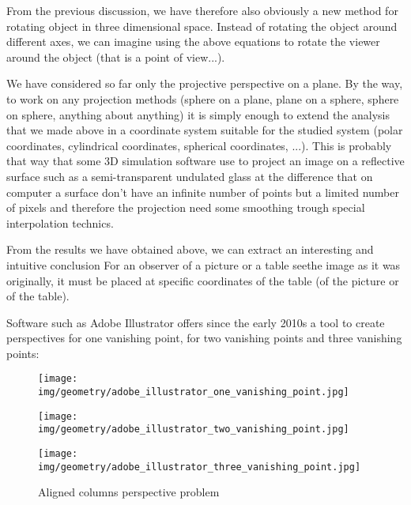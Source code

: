 	From the previous discussion, we have therefore also obviously a new method for rotating object in three dimensional space. Instead of rotating the object around different axes, we can imagine using the above equations to rotate the viewer around the object (that is a point of view...).

	We have considered so far only the projective perspective on a plane. By the way, to work on any projection methods (sphere on a plane, plane on a sphere, sphere on sphere, anything about anything) it is simply enough to extend the analysis that we made above in a coordinate system suitable for the studied system (polar coordinates, cylindrical coordinates, spherical coordinates, ...). This is probably that way that some 3D simulation software use to project an image on a reflective surface such as a semi-transparent undulated glass at the difference that on computer a surface don't have an infinite number of points but a limited number of pixels and therefore the projection need some smoothing trough special interpolation technics.
	
	\begin{tcolorbox}[title=Remark,colframe=black,arc=10pt]
	From the results we have obtained above, we can extract an interesting and intuitive conclusion For an observer of a picture or a table seethe image as it was originally, it must be placed at specific coordinates of the table (of the picture or of the table).
	\end{tcolorbox}
	Software such as Adobe Illustrator offers since the early 2010s a tool to create perspectives for one vanishing point, for two vanishing points and three vanishing points:
	\begin{figure}[H]
		\centering
		\texttt{[image: img/geometry/adobe\_illustrator\_one\_vanishing\_point.jpg]}
	\end{figure}
	\begin{figure}[H]
		\centering
		\texttt{[image: img/geometry/adobe\_illustrator\_two\_vanishing\_point.jpg]}
	\end{figure}
	\begin{figure}[H]
		\centering
		\texttt{[image: img/geometry/adobe\_illustrator\_three\_vanishing\_point.jpg]}
		\caption{Aligned columns perspective problem}
	\end{figure}
	

	\pagebreak
